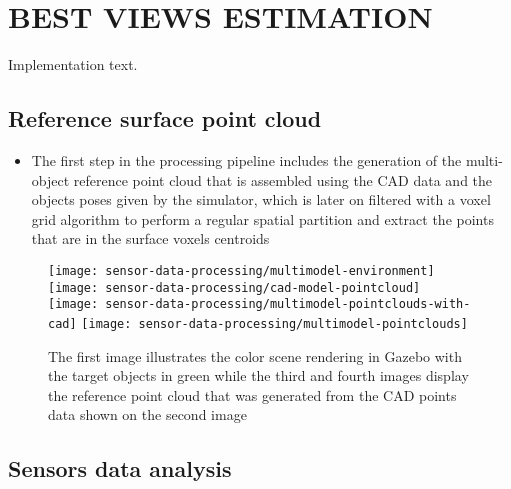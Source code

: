 \section{\uppercase{Best views estimation}}\label{sec:best-views-estimation}

\noindent Implementation text.

\subsection{Reference surface point cloud}

\begin{itemize}
	\item The first step in the processing pipeline includes the generation of the multi-object reference point cloud that is assembled using the CAD data and the objects poses given by the simulator, which is later on filtered with a voxel grid algorithm to perform a regular spatial partition and extract the points that are in the surface voxels centroids
\end{itemize}
\begin{figure}
	\centering
	\texttt{[image: sensor-data-processing/multimodel-environment]}\hspace{2em}
	\texttt{[image: sensor-data-processing/cad-model-pointcloud]}
	\texttt{[image: sensor-data-processing/multimodel-pointclouds-with-cad]}\hspace{2em}
	\texttt{[image: sensor-data-processing/multimodel-pointclouds]}
	\caption{The first image illustrates the color scene rendering in Gazebo with the target objects in green while the third and fourth images display the reference point cloud that was generated from the CAD points data shown on the second image}
\end{figure}


\subsection{Sensors data analysis}

